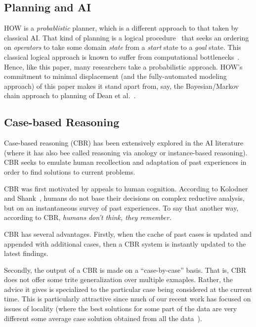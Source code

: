 \documentclass[conference]{IEEEtran}
\begin{document}
\subsection{Planning and AI}
HOW is a {\em probablistic} planner, which is a different approach to that taken by
classical AI. 
That kind of planning is a logical procedure~\cite{Fikes1971}
that seeks an ordering on {\em operators} to take some domain
{\em state} from a {\em start} state to a {\em goal} state.
This classical logical approach is known to suffer from
computational bottlenecks~\cite{Bylander1994}. Hence,
like this paper,
many researchers take a probabilistic approach.
HOW's commitment to minimal displacement (and the fully-automated
modeling approach) of this paper makes it stand apart from, say,
  the Bayesian/Markov chain approach to planning of Dean et al.~\cite{dean1995planning}.

\subsection{Case-based Reasoning}
Case-based reasoning (CBR) has been extensively
explored in the AI literature
(where it has also bee called
 reasoning via anology or instance-based reasoning).
CBR seeks to emulate human recollection and adaptation
of past experiences in order to find solutions to current
problems. 

CBR was first motivated by appeals to human cognition. According to 
Kolodner~\cite{Kolodner1992} and Shank~\cite{Schank1977},
humans do not base their decisions
on complex reductive analysis, but on an instantaneous survey of past experiences.
To say that   another way, according  to  CBR, 
{\em humans  don’t
think,  they remember.}



CBR has several advantages.
Firstly,
when the  cache of past cases is  updated and appended with additional cases, then a CBR system is instantly updated
to the latest findings.  

Secondly, the output of a CBR is made on a ``case-by-case'' basis. 
That is, CBR does not offer some trite generalization over multiple
exmaples. Rather, the advice it gives is specialized to the particular
case being considered at the current time.  This is particularly attractive
since much of our recent work has focused on issues
of locality (where the best solutions for some part of the data
are very different some average case solution obtained from all the data~\cite{localvsglobal}).  
\end{document}
